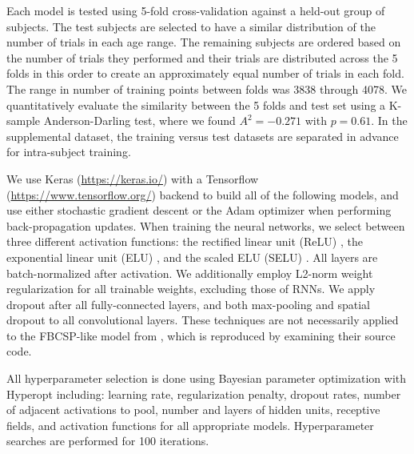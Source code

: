\documentclass[fleqn,10pt]{wlscirep}
\begin{document}
Each model is tested using 5-fold cross-validation against a held-out group of subjects. The test subjects are selected to have a similar distribution of the number of trials in each age range. The remaining subjects are ordered based on the number of trials they performed and their trials are distributed across the 5 folds in this order to create an approximately equal number of trials in each fold. The range in number of training points between folds was 3838 through 4078. We quantitatively evaluate the similarity between the 5 folds and test set using a K-sample Anderson-Darling test, where we found $A^2=-0.271$ with $p=0.61$. In the supplemental dataset, the training versus test datasets are separated in advance for intra-subject training.

We use Keras (\url{https://keras.io/}) with a Tensorflow (\url{https://www.tensorflow.org/}) backend to build all of the following models, and use either stochastic gradient descent or the Adam optimizer\cite{Kingma2015} when performing back-propagation updates. When training the neural networks, we select between three different activation functions: the rectified linear unit (ReLU) \cite{He2015a}, the exponential linear unit (ELU) \cite{Clevert}, and the scaled ELU (SELU) \cite{NIPS2017_6698}. All layers are batch-normalized \cite{Szegedy2015} after activation. We additionally employ L2-norm weight regularization for all trainable weights, excluding those of RNNs. We apply dropout \cite{Srivastava2014} after all fully-connected layers, and both max-pooling and spatial dropout \cite{Tompson2015} to all convolutional layers. These techniques are not necessarily applied to the FBCSP-like model from \cite{Schirrmeister2017}, which is reproduced by examining their source code.

All hyperparameter selection is done using Bayesian parameter optimization with Hyperopt \cite{Bergstra2013} including: learning rate, regularization penalty, dropout rates, number of adjacent activations to pool, number and layers of hidden units, receptive fields, and activation functions for all appropriate models. Hyperparameter searches are performed for 100 iterations.



\end{document}
